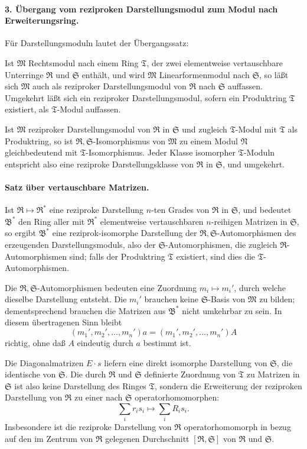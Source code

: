 \documentclass[11pt]{article}
\providecommand{\frR}{\mathfrak R}
\providecommand{\frS}{\mathfrak S}
\providecommand{\frT}{\mathfrak T}
\providecommand{\frM}{\mathfrak M}
\providecommand{\frN}{\mathfrak N}
\providecommand{\frB}{\mathfrak B}
\begin{document}
\paragraph{3. Übergang vom reziproken Darstellungsmodul zum Modul nach Erweiterungsring.}
Für Darstellungsmoduln lautet der Übergangssatz:

Ist \(\frM\) Rechtsmodul nach einem Ring \(\frT\), der zwei elementweise vertauschbare Unterringe \(\frR\) und \(\frS\) enthält, und wird \(\frM\) Linearformenmodul nach \(\frS\), so läßt sich \(\frM\) auch als reziproker Darstellungsmodul von \(\frR\) nach \(\frS\) auffassen. Umgekehrt läßt sich ein reziproker Darstellungsmodul, sofern ein Produktring \(\frT\) existiert, als \(\frT\)-Modul auffassen.

Ist \(\frM\) reziproker Darstellungsmodul von \(\frR\) in \(\frS\) und zugleich \(\frT\)-Modul mit \(\frT\) als Produktring, so ist \(\frR,\frS\)-Isomorphismus von \(\frM\) zu einem Modul \(\frN\) gleichbedeutend mit \(\frT\)-Isomorphismus. Jeder Klasse isomorpher \(\frT\)-Moduln entspricht also eine reziproke Darstellungsklasse von \(\frR\) in \(\frS\), und umgekehrt.

\paragraph{Satz über vertauschbare Matrizen.}
Ist \(\frR\mapsto\frR^*\) eine reziproke Darstellung \(n\)-ten Grades von \(\frR\) in \(\frS\), und bedeutet \(\frB^*\) den Ring aller mit \(\frR^*\) elementweise vertauschbaren \(n\)-reihigen Matrizen in \(\frS\), so ergibt \(\frB^*\) eine reziprok-isomorphe Darstellung der \(\frR,\frS\)-Automorphismen des erzeugenden Darstellungsmoduls, also der \(\frS\)-Automorphismen, die zugleich \(\frR\)-Automorphismen sind; falls der Produktring \(\frT\) existiert, sind dies die \(\frT\)-Automorphismen.

Die \(\frR,\frS\)-Automorphismen bedeuten eine Zuordnung \(m_i\mapsto m_i'\), durch welche dieselbe Darstellung entsteht. Die \(m_i'\) brauchen keine \(\frS\)-Basis von \(\frM\) zu bilden; dementsprechend brauchen die Matrizen aus \(\frB^*\) nicht umkehrbar zu sein. In diesem übertragenen Sinn bleibt
\[
        (m_1',m_2',\ldots,m_n')a=(m_1',m_2',\ldots,m_n')A
\]
richtig, ohne daß \(A\) eindeutig durch \(a\) bestimmt ist.

Die Diagonalmatrizen \(E\cdot s\) liefern eine direkt isomorphe Darstellung von \(\frS\), die identische von \(\frS\). Die durch \(\frR\) und \(\frS\) definierte Zuordnung von \(\frT\) zu Matrizen in \(\frS\) ist also keine Darstellung des Ringes \(\frT\), sondern die Erweiterung der reziproken Darstellung von \(\frR\) zu einer nach \(\frS\) operatorhomomorphen:
\[
        \sum_i r_i s_i\longmapsto \sum_i R_i s_i.
\]
Insbesondere ist die reziproke Darstellung von \(\frR\) operatorhomomorph in bezug auf den im Zentrum von \(\frR\) gelegenen Durchschnitt \([\frR,\frS]\) von \(\frR\) und \(\frS\).
\end{document}
